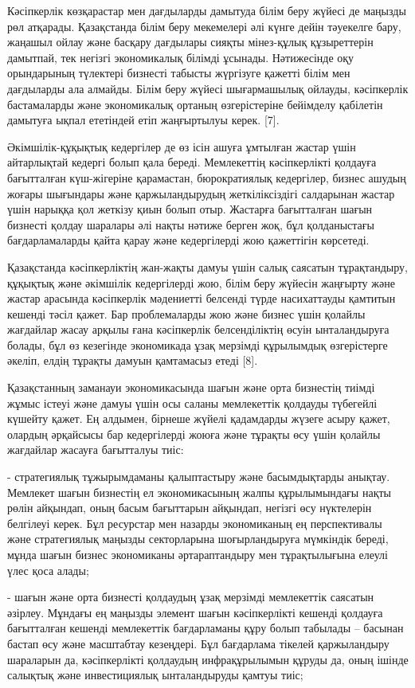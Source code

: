 Кәсіпкерлік көзқарастар мен дағдыларды дамытуда білім беру жүйесі де
маңызды рөл атқарады. Қазақстанда білім беру мекемелері әлі күнге дейін
тәуекелге бару, жаңашыл ойлау және басқару дағдылары сияқты мінез-құлық
құзыреттерін дамытпай, тек негізгі экономикалық білімді ұсынады.
Нәтижесінде оқу орындарының түлектері бизнесті табысты жүргізуге қажетті
білім мен дағдыларды ала алмайды. Білім беру жүйесі шығармашылық
ойлауды, кәсіпкерлік бастамаларды және экономикалық ортаның
өзгерістеріне бейімделу қабілетін дамытуға ықпал ететіндей етіп
жаңғыртылуы керек. {[}7{]}.

Әкімшілік-құқықтық кедергілер де өз ісін ашуға ұмтылған жастар үшін
айтарлықтай кедергі болып қала береді. Мемлекеттің кәсіпкерлікті
қолдауға бағытталған күш-жігеріне қарамастан, бюрократиялық кедергілер,
бизнес ашудың жоғары шығындары және қаржыландырудың жеткіліксіздігі
салдарынан жастар үшін нарыққа қол жеткізу қиын болып отыр. Жастарға
бағытталған шағын бизнесті қолдау шаралары әлі нақты нәтиже берген жоқ,
бұл қолданыстағы бағдарламаларды қайта қарау және кедергілерді жою
қажеттігін көрсетеді.

Қазақстанда кәсіпкерліктің жан-жақты дамуы үшін салық саясатын
тұрақтандыру, құқықтық және әкімшілік кедергілерді жою, білім беру
жүйесін жаңғырту және жастар арасында кәсіпкерлік мәдениетті белсенді
түрде насихаттауды қамтитын кешенді тәсіл қажет. Бар проблемаларды жою
және бизнес үшін қолайлы жағдайлар жасау арқылы ғана кәсіпкерлік
белсенділіктің өсуін ынталандыруға болады, бұл өз кезегінде экономикада
ұзақ мерзімді құрылымдық өзгерістерге әкеліп, елдің тұрақты дамуын
қамтамасыз етеді {[}8{]}.

Қазақстанның заманауи экономикасында шағын және орта бизнестің тиімді
жұмыс істеуі және дамуы үшін осы саланы мемлекеттік қолдауды түбегейлі
күшейту қажет. Ең алдымен, бірнеше жүйелі қадамдарды жүзеге асыру қажет,
олардың әрқайсысы бар кедергілерді жоюға және тұрақты өсу үшін қолайлы
жағдайлар жасауға бағытталуы тиіс:

- стратегиялық тұжырымдаманы қалыптастыру және басымдықтарды анықтау.
Мемлекет шағын бизнестің ел экономикасының жалпы құрылымындағы нақты
рөлін айқындап, оның басым бағыттарын айқындап, негізгі өсу нүктелерін
белгілеуі керек. Бұл ресурстар мен назарды экономиканың ең перспективалы
және стратегиялық маңызды секторларына шоғырландыруға мүмкіндік береді,
мұнда шағын бизнес экономиканы әртараптандыру мен тұрақтылығына елеулі
үлес қоса алады;

- шағын және орта бизнесті қолдаудың ұзақ мерзімді мемлекеттік саясатын
әзірлеу. Мұндағы ең маңызды элемент шағын кәсіпкерлікті кешенді қолдауға
бағытталған кешенді мемлекеттік бағдарламаны құру болып табылады --
басынан бастап өсу және масштабтау кезеңдері. Бұл бағдарлама тікелей
қаржыландыру шараларын да, кәсіпкерлікті қолдаудың инфрақұрылымын құруды
да, оның ішінде салықтық және инвестициялық ынталандыруды қамтуы тиіс;

